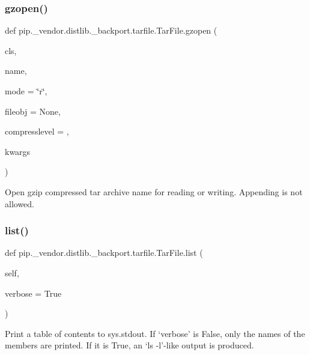\subsubsection{\texorpdfstring{gzopen()}{gzopen()}}
{\footnotesize\ttfamily def pip.\+\_\+vendor.\+distlib.\+\_\+backport.\+tarfile.\+Tar\+File.\+gzopen (\begin{DoxyParamCaption}\item[{}]{cls,  }\item[{}]{name,  }\item[{}]{mode = {\ttfamily \char`\"{}r\char`\"{}},  }\item[{}]{fileobj = {\ttfamily None},  }\item[{}]{compresslevel = {},  }\item[{}]{kwargs }\end{DoxyParamCaption})}

\begin{DoxyVerb}Open gzip compressed tar archive name for reading or writing.
   Appending is not allowed.
\end{DoxyVerb}
 \mbox{\label{classpip_1_1__vendor_1_1distlib_1_1__backport_1_1tarfile_1_1TarFile_ab9aea2de950c8e5330ac6be26a8a3afd}} 
\subsubsection{\texorpdfstring{list()}{list()}}
{\footnotesize\ttfamily def pip.\+\_\+vendor.\+distlib.\+\_\+backport.\+tarfile.\+Tar\+File.\+list (\begin{DoxyParamCaption}\item[{}]{self,  }\item[{}]{verbose = {\ttfamily True} }\end{DoxyParamCaption})}

\begin{DoxyVerb}Print a table of contents to sys.stdout. If `verbose' is False, only
   the names of the members are printed. If it is True, an `ls -l'-like
   output is produced.
\end{DoxyVerb}
 \mbox{\label{classpip_1_1__vendor_1_1distlib_1_1__backport_1_1tarfile_1_1TarFile_a9c52b5a6631598fa7b01f6043041c9d2}} 
